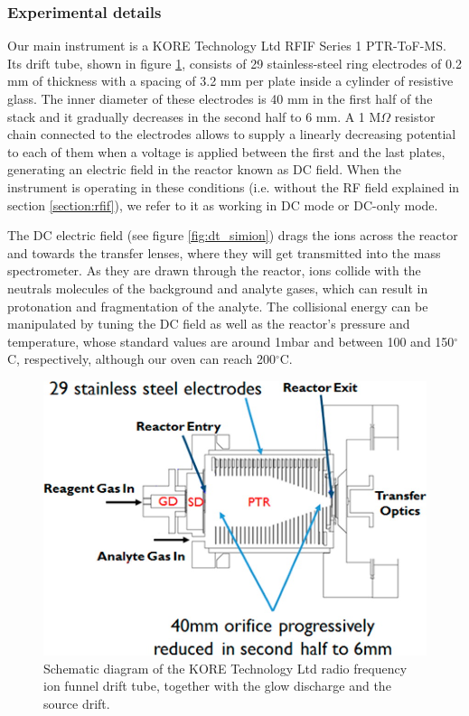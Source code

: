 \subsubsection{Experimental details}
Our main instrument is a KORE Technology Ltd RFIF Series 1 PTR-ToF-MS. Its drift tube, shown in figure \ref{fig:dt_diagram}, consists of 29 stainless-steel ring electrodes of 0.2 mm of thickness with a spacing of 3.2 mm per plate inside a cylinder of resistive glass. The inner diameter of these electrodes is 40 mm in the first half of the stack and it gradually decreases in the second half to 6 mm. A 1 M$\Omega$ resistor chain connected to the electrodes allows to supply a linearly decreasing potential to each of them when a voltage is applied between the first and the last plates, generating an electric field in the reactor known as DC field. When the instrument is operating in these conditions (i.e. without the RF field explained in section \ref{section:rfif}), we refer to it as working in DC mode or DC-only mode.

The DC electric field (see figure \ref{fig:dt_simion}) drags the ions across the reactor and towards the transfer lenses, where they will get transmitted into the mass spectrometer. As they are drawn through the reactor, ions collide with the neutrals molecules of the background and analyte gases, which can result in protonation and fragmentation of the analyte. The collisional energy can be manipulated by tuning the DC field as well as the reactor's pressure and temperature, whose standard values are around 1mbar and between 100 and 150$^{\circ}$C, respectively, although our oven can reach 200$^{\circ}$C. 


\begin{figure}%
\centering
\includegraphics[width=0.6\linewidth]{pics/ac-2016-02982x_0002.jpeg}
\centering
\caption{Schematic diagram of the KORE Technology Ltd radio frequency ion funnel drift tube, together with the glow discharge and the source drift.}
\label{fig:dt_diagram}
\end{figure}


